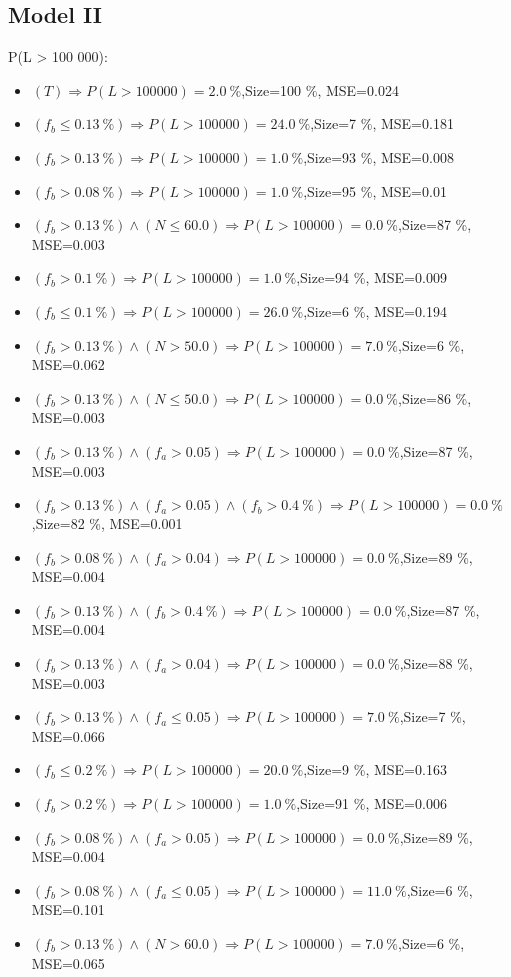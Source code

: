 \documentclass[numbered]{CSL}
\begin{document}
\subsection{Model II}
P(L > 100 000):
\begin{itemize}
\item $(T) \Rightarrow P(L > 100 000) = 2.0~\%$,\hfill Size=100 \%, MSE=0.024
\item $(f_b \leq 0.13~\%) \Rightarrow P(L > 100 000) = 24.0~\%$,\hfill Size=7 \%, MSE=0.181
\item $(f_b > 0.13~\%) \Rightarrow P(L > 100 000) = 1.0~\%$,\hfill Size=93 \%, MSE=0.008
\item $(f_b > 0.08~\%) \Rightarrow P(L > 100 000) = 1.0~\%$,\hfill Size=95 \%, MSE=0.01
\item $(f_b > 0.13~\%) \land (N \leq 60.0) \Rightarrow P(L > 100 000) = 0.0~\%$,\hfill Size=87 \%, MSE=0.003
\item $(f_b > 0.1~\%) \Rightarrow P(L > 100 000) = 1.0~\%$,\hfill Size=94 \%, MSE=0.009
\item $(f_b \leq 0.1~\%) \Rightarrow P(L > 100 000) = 26.0~\%$,\hfill Size=6 \%, MSE=0.194
\item $(f_b > 0.13~\%) \land (N > 50.0) \Rightarrow P(L > 100 000) = 7.0~\%$,\hfill Size=6 \%, MSE=0.062
\item $(f_b > 0.13~\%) \land (N \leq 50.0) \Rightarrow P(L > 100 000) = 0.0~\%$,\hfill Size=86 \%, MSE=0.003
\item $(f_b > 0.13~\%) \land (f_a > 0.05) \Rightarrow P(L > 100 000) = 0.0~\%$,\hfill Size=87 \%, MSE=0.003
\item $(f_b > 0.13~\%) \land (f_a > 0.05) \land (f_b > 0.4~\%) \Rightarrow P(L > 100 000) = 0.0~\%$,\hfill Size=82 \%, MSE=0.001
\item $(f_b > 0.08~\%) \land (f_a > 0.04) \Rightarrow P(L > 100 000) = 0.0~\%$,\hfill Size=89 \%, MSE=0.004
\item $(f_b > 0.13~\%) \land (f_b > 0.4~\%) \Rightarrow P(L > 100 000) = 0.0~\%$,\hfill Size=87 \%, MSE=0.004
\item $(f_b > 0.13~\%) \land (f_a > 0.04) \Rightarrow P(L > 100 000) = 0.0~\%$,\hfill Size=88 \%, MSE=0.003
\item $(f_b > 0.13~\%) \land (f_a \leq 0.05) \Rightarrow P(L > 100 000) = 7.0~\%$,\hfill Size=7 \%, MSE=0.066
\item $(f_b \leq 0.2~\%) \Rightarrow P(L > 100 000) = 20.0~\%$,\hfill Size=9 \%, MSE=0.163
\item $(f_b > 0.2~\%) \Rightarrow P(L > 100 000) = 1.0~\%$,\hfill Size=91 \%, MSE=0.006
\item $(f_b > 0.08~\%) \land (f_a > 0.05) \Rightarrow P(L > 100 000) = 0.0~\%$,\hfill Size=89 \%, MSE=0.004
\item $(f_b > 0.08~\%) \land (f_a \leq 0.05) \Rightarrow P(L > 100 000) = 11.0~\%$,\hfill Size=6 \%, MSE=0.101
\item $(f_b > 0.13~\%) \land (N > 60.0) \Rightarrow P(L > 100 000) = 7.0~\%$,\hfill Size=6 \%, MSE=0.065
\end{itemize}
\end{document}
